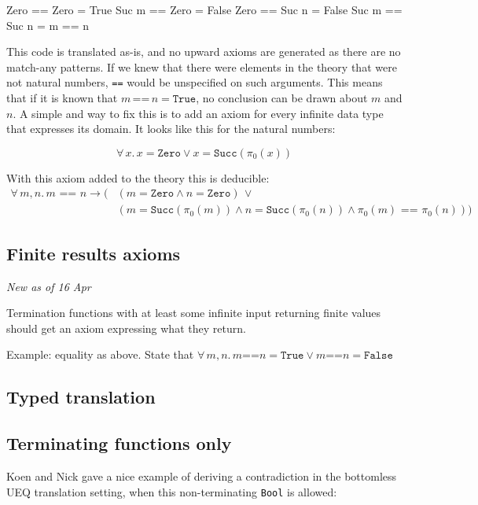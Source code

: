 \documentclass{article}
\newcommand\hs[1]{\texttt{#1}}
\newcommand\fa[1]{\forall \, #1 . \,}
\newcommand\faa[2]{\forall \, #1 , #2 . \,}
\newcommand\w[0]{\,\,}
\begin{document}
\begin{code}
Zero  == Zero  = True
Suc m == Zero  = False
Zero  == Suc n = False
Suc m == Suc n = m == n
\end{code}

\noindent
This code is translated as-is, and no upward axioms are generated as
there are no match-any patterns. If we knew that there were elements
in the theory that were not natural numbers, \hs{==} would be
unspecified on such arguments. This means that if it is known that
$m \, \hs{==} \, n = \hs{True}$, no conclusion can be drawn about $m$ and
$n$. A simple and way to fix this is to add an axiom for every
infinite data type that expresses its domain. It looks like this for
the natural numbers:

$$\fa{x} x = \hs{Zero} \vee x = \hs{Succ}(\pi_0(x))$$

With this axiom added to the theory this is deducible:
\begin{align*}
\faa{m}{n} m \w \hs{==} \w n \rightarrow ( & (m = \hs{Zero} \wedge n = \hs{Zero}) \, \vee \\
                                           & (m = \hs{Succ}(\pi_0(m)) \wedge n = \hs{Succ}(\pi_0(n)) \wedge \pi_0(m) \w \hs{==} \w \pi_0(n)) )
\end{align*}

\subsection*{Finite results axioms}

\emph{New as of 16 Apr}

Termination functions with at least some infinite input returning
finite values should get an axiom expressing what they return.

Example: equality as above. State that
$\faa{m}{n} m \hs{==} n = \hs{True} \vee m \hs{==} n = \hs{False}$

\subsection*{Typed translation}

\subsection*{Terminating functions only}

Koen and Nick gave a nice example of deriving a contradiction in the
bottomless UEQ translation setting, when this non-terminating \hs{Bool} is allowed:
\end{document}
